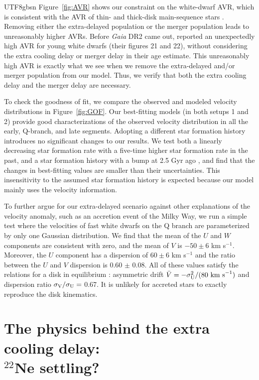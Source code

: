 \documentclass[twocolumn, times, trackchanges]{aastex63_bren}
\begin{document}
\begin{CJK*}{UTF8}{gbsn}
Figure~\ref{fig:AVR} shows our constraint on the white-dwarf AVR, which is consistent with the AVR of thin- and thick-disk main-sequence stars \citep{Holmberg_2009, Sharma_2014}.
Removing either the extra-delayed population or the merger population leads to unreasonably higher AVRs. 
Before {\it Gaia} DR2 came out, \citet{Anguiano_2017} reported an unexpectedly high AVR for young white dwarfs (their figures 21 and 22), without considering the extra cooling delay or merger delay in their age estimate. This unreasonably high AVR is exactly what we see when we remove the extra-delayed and/or merger population from our model.
Thus, we verify that both the extra cooling delay and the merger delay are necessary.

To check the goodness of fit, we compare the observed and modeled velocity distributions in Figure~\ref{fig:GOF}. Our best-fitting models (in both setups 1 and 2) provide good characterizations of the observed velocity distribution in all the early, Q-branch, and late segments. Adopting a different star formation history introduces no significant changes to our results. We test both a linearly decreasing star formation rate with a five-time higher star formation rate in the past, and a star formation history with a bump at 2.5 Gyr ago \citep[e.g.,][]{Mor_2019}, and find that the changes in best-fitting values are smaller than their uncertainties. This insensitivity to the assumed star formation history is expected because our model mainly uses the velocity information.

To further argue for our extra-delayed scenario against other explanations of the velocity anomaly, such as an accretion event of the Milky Way, we run a simple test where the velocities of fast white dwarfs on the Q branch are parameterized by only one Gaussian distribution. We find that the mean of the $U$ and $W$ components are consistent with zero, and the mean of $V$ is $-50\pm6$ km s$^{-1}$. Moreover, the $U$ component has a dispersion of $60\pm6$ km s$^{-1}$ and the ratio between the $U$ and $V$ dispersion is 0.60 $\pm$ 0.08. All of these values satisfy the relations for a disk in equilibrium \citep[e.g.,][]{Binney_2008}: asymmetric drift $\bar{V}=-\sigma_{\rm U}^2/(80\text{ km s}^{-1})$ and dispersion ratio $\sigma_{\rm V}/\sigma_{\rm U}=$ 0.67. It is unlikely for accreted stars to exactly reproduce the disk kinematics.


\section[The physics behind the extra cooling delay: 22Ne settling?]{The physics behind the extra cooling delay: \\$^{22}$Ne settling?}
\label{sec:22Ne}


\end{CJK*}
\end{document}

